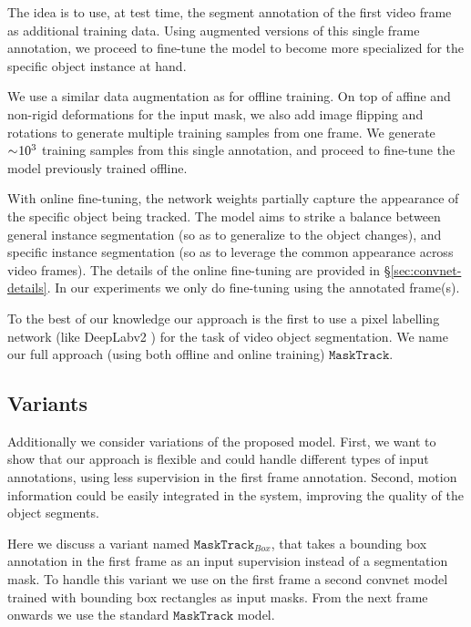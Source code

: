 \documentclass[10pt,twocolumn,letterpaper]{article}
\makeatletter
\renewcommand{\paragraph}{\@startsection{paragraph}{4}{\z@}{0.5ex \@plus 1ex \@minus .2ex}{-0.5em}{\normalfont \normalsize \bfseries}}
\makeatother
\begin{document}
The idea is to use, at test time, the segment annotation of the first video frame as additional training data.
Using augmented versions of this single frame annotation, we proceed to fine-tune the model to become more specialized for the specific object instance at hand.

We use a similar data augmentation as for offline training. On top of affine and non-rigid deformations for the input mask, we also add image flipping and rotations to generate multiple training samples from one frame.
We generate $\sim\negmedspace10^3$ training samples from this single annotation,
and proceed to fine-tune the model previously trained offline.

With online fine-tuning, the network weights partially capture the appearance of the specific object being tracked. The model aims to strike a balance between general instance segmentation
(so as to generalize to the object changes), and specific instance segmentation (so as to leverage the common appearance across video frames). The details of the online fine-tuning are provided in
\S\ref{sec:convnet-details}. In our experiments we only do fine-tuning using the annotated frame(s).

To the best of our knowledge our approach is the first to use a pixel labelling network (like DeepLabv2 \cite{Chen2016ArxivDeeplabv2}) for the task of video object segmentation.
We name our full approach (using both offline and online training) $\mathtt{MaskTrack}$.



\subsection{Variants}
\label{sec:method-variants}
Additionally we consider variations of the proposed model.
First, we want to show that our approach is flexible and could handle different types of input annotations, using less supervision in the first frame annotation.
Second, motion information could be easily integrated in the system, improving the quality of the object segments.

\paragraph{Box annotation}
Here we discuss a variant named $\mathtt{MaskTrack}_{Box}$, that takes a bounding box annotation in the first frame as an input supervision instead of a segmentation mask.
To handle this variant we use on the first frame a second convnet model trained with bounding box rectangles as input masks. From the next frame onwards we use the standard $\mathtt{MaskTrack}$ model.
\end{document}
